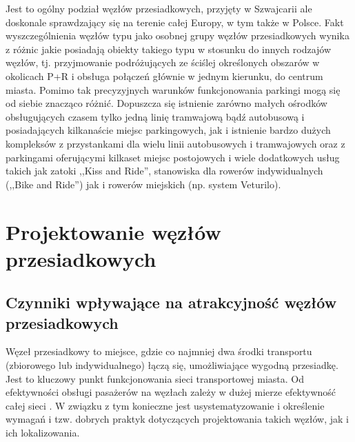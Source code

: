 \documentclass[twoside,12pt]{article}
\begin{document}
		Jest to ogólny podział węzłów przesiadkowych, przyjęty w Szwajcarii ale doskonale sprawdzający się na terenie całej Europy, w tym także w Polsce. Fakt wyszczególnienia węzłów typu \pnr{} jako osobnej grupy węzłów przesiadkowych wynika z różnic jakie posiadają obiekty takiego typu w stosunku do innych rodzajów węzłów, tj. przyjmowanie podróżujących ze ściślej określonych obszarów w okolicach P+R i obsługa połączeń głównie w jednym kierunku, do centrum miasta. Pomimo tak precyzyjnych warunków funkcjonowania parkingi \pnr{} mogą się od siebie znacząco różnić. Dopuszcza się istnienie zarówno małych ośrodków obsługujących czasem tylko jedną linię tramwajową bądź autobusową i posiadających kilkanaście miejsc parkingowych, jak i istnienie bardzo dużych kompleksów z przystankami dla wielu linii autobusowych i tramwajowych oraz z parkingami oferującymi kilkaset miejsc postojowych i wiele dodatkowych usług takich jak zatoki ,,Kiss and Ride'', stanowiska dla rowerów indywidualnych (,,Bike and Ride'') jak i rowerów miejskich (np. system Veturilo). 

\clearpage
\section{Projektowanie węzłów przesiadkowych}

	\subsection{Czynniki wpływające na atrakcyjność węzłów przesiadkowych}

	Węzeł przesiadkowy to miejsce, gdzie co najmniej dwa środki transportu (zbiorowego lub indywidualnego) łączą się, umożliwiające wygodną przesiadkę. Jest to kluczowy punkt funkcjonowania sieci transportowej miasta. Od efektywności obsługi pasażerów na węzłach zależy w dużej mierze efektywność całej sieci \cite{urbanistyka}. W związku z tym konieczne jest usystematyzowanie i określenie wymagań i tzw. dobrych praktyk dotyczących projektowania takich węzłów, jak i ich lokalizowania. 
	
\end{document}
